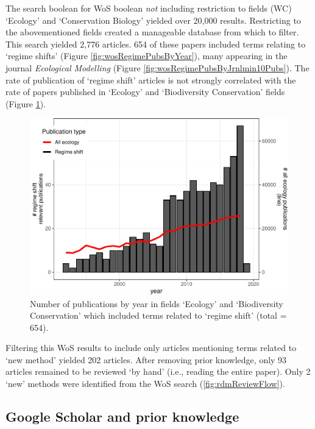 \documentclass[12pt,twoside,openany]{reedthesis}
\begin{document}
The search boolean for WoS boolean \emph{not} including restriction to
fields (WC) `Ecology' and `Conservation Biology' yielded over 20,000
results. Restricting to the abovementioned fields created a manageable
database from which to filter. This search yielded 2,776 articles. 654
of these papers included terms relating to `regime shifts' (Figure
\ref{fig:wosRegimePubsByYear}), many appearing in the journal
\emph{Ecological Modelling} (Figure
\ref{fig:wosRegimePubsByJrnlmin10Pubs}). The rate of publication of
`regime shift' articles is not strongly correlated with the rate of
papers published in `Ecology' and `Biodiversity Conservation' fields
(Figure \ref{fig:wosRegimePubsByYearwithNumEcolPubs}).
\begin{figure}
\centering
\includegraphics{_myDissertation_files/figure-latex/wosRegimePubsByYearwithNumEcolPubs-1.pdf}
\caption{\label{fig:wosRegimePubsByYearwithNumEcolPubs}Number of
publications by year in fields `Ecology' and `Biodiversity Conservation'
which included terms related to `regime shift' (total = 654).}
\end{figure}
Filtering this WoS results to include only articles mentioning terms
related to `new method' yielded 202 articles. After removing prior
knowledge, only 93 articles remained to be reviewed `by hand' (i.e.,
reading the entire paper). Only 2 `new' methods were identified from the
WoS search (\ref{fig:rdmReviewFlow}).

\subsection{Google Scholar and prior
knowledge}\label{google-scholar-and-prior-knowledge}
\end{document}
